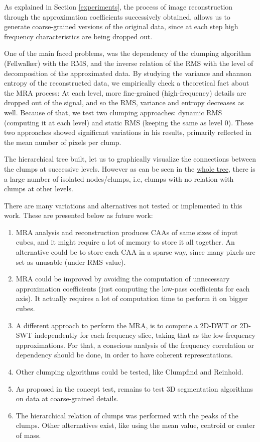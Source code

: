 \documentclass[letter, 11pt]{article}
\begin{document}
As explained in Section \ref{experiments}, the process of image reconstruction through the approximation coefficients successively obtained, allows us to generate coarse-grained versions of the original data, since at each step high frequency characteristics are being dropped out.

One of the main faced problems, was the dependency of the clumping algorithm (Fellwalker) with the RMS, and the inverse relation of the RMS with the level of decomposition of the approximated data. By studying the variance and shannon entropy of the reconstructed data, we empirically check a theoretical fact about the MRA process: At each level, more fine-grained (high-frequency) details are dropped out of the signal, and so the RMS, variance and entropy decreases as well. Because of that, we test two clumping approaches: dynamic RMS (computing it at each level) and static RMS (keeping the same as level $0$). These two approaches showed significant variations in his results, primarily reflected in the mean number of pixels per clump.   


The hierarchical tree built, let us to graphically visualize the connections between the clumps at successive levels. However as can be seen in the \href{https://github.com/mavillan/WavClump/tree/master/src/htree.png}{whole tree}, there is a large number of isolated nodes/clumps, i.e, clumps with no relation with clumps at other levels.

There are many variations and alternatives not tested or implemented in this work. These are presented below as future work:

\begin{enumerate}
    \item MRA analysis and reconstruction produces CAAs of same sizes of input cubes, and it might require a lot of memory to store it all together. An alternative could be to store each CAA in a sparse way, since many pixels are set as unusable (under RMS value).
    \item MRA could be improved by avoiding the computation of unnecessary approximation coefficients (just computing the low-pass coefficients for each axis). It actually requires a lot of computation time to perform it on bigger cubes.
    \item A different approach to perform the MRA, is to compute a 2D-DWT or 2D-SWT independently for each frequency slice, taking that as the low-frequency approximations. For that, a conscious analysis of the frequency correlation or dependency should be done, in order to have coherent representations.
    \item Other clumping algorithms could be tested, like Clumpfind and Reinhold.
    \item As proposed in the concept test, remains to test 3D segmentation algorithms on data at coarse-grained details.
    \item The hierarchical relation of clumps was performed with the peaks of the clumps. Other alternatives exist, like using the mean value, centroid or center of mass.
\end{enumerate}



\newpage
{}

\end{document}
